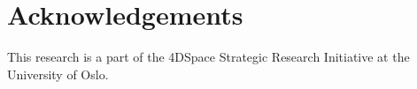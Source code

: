 \documentclass[%
oneside,                 %
final,                   %
10pt]{article}
\begin{document}
\section{Acknowledgements}
This research is a part of the 4DSpace Strategic Research Initiative at the University of Oslo. 









\cleardoublepage{}  %
\printindex
\end{document}
